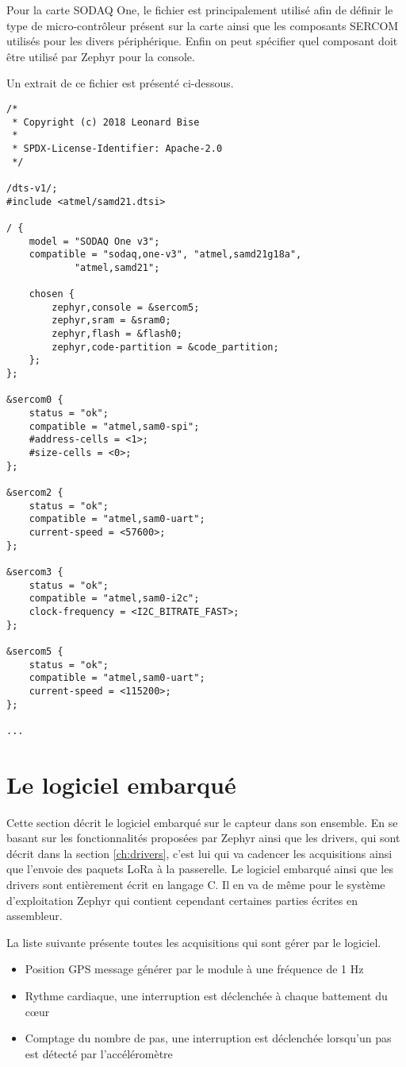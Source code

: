 Pour la carte SODAQ One, le fichier est principalement utilisé afin de définir le type de micro-contrôleur présent sur la carte ainsi que les composants SERCOM utilisés pour les divers périphérique. Enfin on peut spécifier quel composant doit être utilisé par Zephyr pour la console.

Un extrait de ce fichier est présenté ci-dessous.

\begin{lstlisting}
/*
 * Copyright (c) 2018 Leonard Bise
 *
 * SPDX-License-Identifier: Apache-2.0
 */

/dts-v1/;
#include <atmel/samd21.dtsi>

/ {
	model = "SODAQ One v3";
	compatible = "sodaq,one-v3", "atmel,samd21g18a",
			"atmel,samd21";

	chosen {
		zephyr,console = &sercom5;
		zephyr,sram = &sram0;
		zephyr,flash = &flash0;
		zephyr,code-partition = &code_partition;
	};
};

&sercom0 {
	status = "ok";
	compatible = "atmel,sam0-spi";
	#address-cells = <1>;
	#size-cells = <0>;
};

&sercom2 {
	status = "ok";
	compatible = "atmel,sam0-uart";
	current-speed = <57600>;
};

&sercom3 {
	status = "ok";
	compatible = "atmel,sam0-i2c";
	clock-frequency = <I2C_BITRATE_FAST>;	
};

&sercom5 {
	status = "ok";
	compatible = "atmel,sam0-uart";
	current-speed = <115200>;
};

...

\end{lstlisting}

\section{Le logiciel embarqué}

Cette section décrit le logiciel embarqué sur le capteur dans son ensemble. En se basant sur les fonctionnalités proposées par Zephyr ainsi que les drivers, qui sont décrit dans la section \ref{ch:drivers}, c'est lui qui va cadencer les acquisitions ainsi que l'envoie des paquets LoRa à la passerelle. Le logiciel embarqué ainsi que les drivers sont entièrement écrit en langage C. Il en va de même pour le système d'exploitation Zephyr qui contient cependant certaines parties écrites en assembleur.

La liste suivante présente toutes les acquisitions qui sont gérer par le logiciel.

\begin{itemize}
\item Position GPS message générer par le module à une fréquence de 1 Hz
\item Rythme cardiaque, une interruption est déclenchée à chaque battement du cœur
\item Comptage du nombre de pas, une interruption est déclenchée lorsqu'un pas est détecté par l'accéléromètre
\end{itemize}

